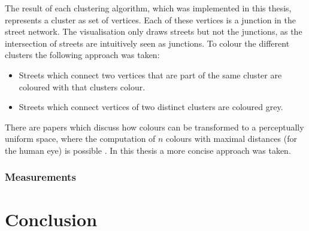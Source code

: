 \documentclass[11pt, a4paper]{report}
\begin{document}
The result of each clustering algorithm, which was implemented in this thesis, represents a cluster as set of vertices. Each of these vertices is a junction in the street network. The visualisation only draws streets but not the junctions, as the intersection of streets are intuitively seen as junctions. To colour the different clusters the following approach was taken:

\begin{itemize}
    \item Streets which connect two vertices that are part of the same cluster are coloured with that clusters colour.
    \item Streets which connect vertices of two distinct clusters are coloured grey.
\end{itemize}

There are papers which discuss how colours can be transformed to a perceptually uniform space, where the computation of $n$ colours with maximal distances (for the human eye) is possible \cite{colors:2006}. In this thesis a more concise approach was taken.


\subsection{Measurements}
\label{sec:measurements}

\chapter{Conclusion}


\appendix
\glsaddall
\printglossaries
\end{document}
